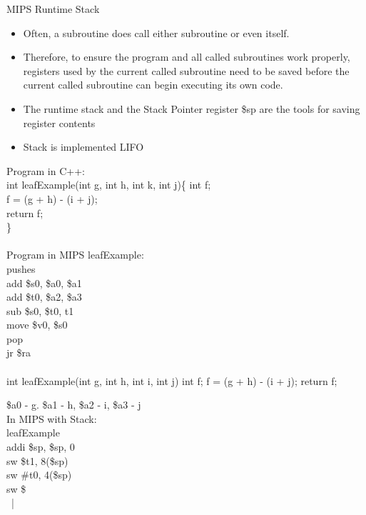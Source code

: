 \documentclass[12pt]{article}
\begin{document}
MIPS Runtime Stack \begin{itemize} 
\item Often, a subroutine does call either subroutine or even itself. 
\item Therefore, to ensure the program and all called subroutines work properly, registers used by the current called subroutine need to be saved before the current called subroutine can begin executing its own code. 
\item The runtime stack and the Stack Pointer register \$sp are the tools for saving register contents 
\item Stack is implemented LIFO  

\end{itemize} 











Program in C++: \\ int leafExample(int g, int h, int k, int j)\{
\indent int f; \\
\indent f = (g + h) - (i + j); \\
\indent return f;  \\
\} \\~\\


Program in MIPS
 \noindent leafExample: \\
 \indent pushes \\
 \indent add \$s0, \$a0, \$a1 \\
 \indent add \$t0, \$a2, \$a3 \\ 
 \indent  sub \$s0, \$t0, t1 \\ 
 \indent move \$v0, \$s0 \\ 
 \indent pop \\
 \indent jr \$ra \\~\\
 
  
 
 int leafExample(int g, int h, int i, int j) {
 int f; 
 f = (g + h) - (i + j); 
 return f; 
 }
 
 \$a0 - g. \$a1 - h, \$a2 - i, \$a3 - j \\
 
In MIPS with Stack: \\ 
leafExample \\
addi \$sp, \$sp, 0 \\
sw \$t1, 8(\$sp) \\ 
sw \#t0, 4(\$sp) \\ 
sw \$ \\~|\
\end{document}
